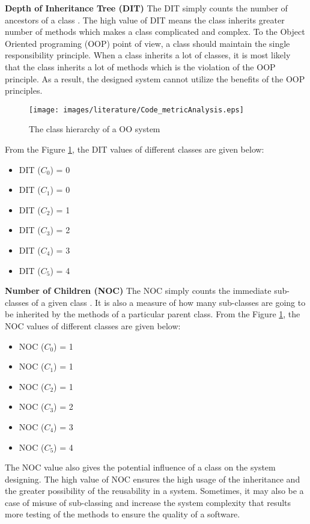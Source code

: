 \documentclass[12pt]{report}
\begin{document}
\textbf{Depth of Inheritance Tree (DIT)}
The DIT simply counts the number of ancestors of a class \cite{chidamber1994metrics}. The high value of DIT means the class inherits greater number of methods which makes a class complicated and complex. To the Object Oriented programing (OOP) point of view, a class should maintain the single responsibility principle. When a class inherits a lot of classes, it is most likely that the class inherits a lot of methods which is the violation of the OOP principle. As a result, the designed system cannot utilize the benefits of the OOP principles. 

\begin{figure}[h!]
  \centering
    \texttt{[image: images/literature/Code\_metricAnalysis.eps]}
		\caption{The class hierarchy of a OO system}
		\label{dit_codeMetrics}
\end{figure}
From the Figure \ref{dit_codeMetrics}, the DIT values of different classes are given below:
\begin{itemize}
\item DIT ($C_{0}$) = 0
\item DIT ($C_{1}$) = 0
\item DIT ($C_{2}$) = 1
\item DIT ($C_{3}$) = 2
\item DIT ($C_{4}$) = 3
\item DIT ($C_{5}$) = 4
\end{itemize}

\textbf{Number of Children (NOC)}
The NOC simply counts the immediate sub-classes of a given class \cite{chidamber1994metrics}. It is also a measure of how many sub-classes are going to be inherited by the methods of a particular parent class. From the Figure \ref{dit_codeMetrics}, the NOC values of different classes are given below:

\begin{itemize}
\item NOC ($C_{0}$) = 1
\item NOC ($C_{1}$) = 1
\item NOC ($C_{2}$) = 1
\item NOC ($C_{3}$) = 2
\item NOC ($C_{4}$) = 3
\item NOC ($C_{5}$) = 4
\end{itemize}

The NOC value also gives the potential influence of a class on the system designing. The high value of NOC ensures the high usage of the inheritance and the greater possibility of the reusability in a system. Sometimes, it may also be a case of misuse of sub-classing and increase the system complexity that results more testing of the methods to ensure the quality of a software.
\end{document}

